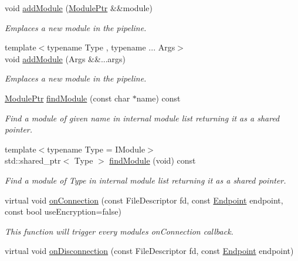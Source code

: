 \begin{DoxyCompactItemize}
void \mbox{\hyperlink{classo_z_1_1_pipeline_aa96f1ef3faeb41c9966d6b5a103fa3a5}{add\+Module}} (\mbox{\hyperlink{namespaceo_z_af5a56aaaee027504979038f38991adcf}{Module\+Ptr}} \&\&module)
\begin{DoxyCompactList}\small\item\em Emplaces a new module in the pipeline. \end{DoxyCompactList}\item 
{\footnotesize template$<$typename Type , typename ... Args$>$ }\\void \mbox{\hyperlink{classo_z_1_1_pipeline_a797f98947aace930fbb15cd6b2d9f726}{add\+Module}} (Args \&\&...args)
\begin{DoxyCompactList}\small\item\em Emplaces a new module in the pipeline. \end{DoxyCompactList}\item 
\mbox{\hyperlink{namespaceo_z_af5a56aaaee027504979038f38991adcf}{Module\+Ptr}} \mbox{\hyperlink{classo_z_1_1_pipeline_aa8aa56af891b2d889e7c21198daa1451}{find\+Module}} (const char $\ast$name) const
\begin{DoxyCompactList}\small\item\em Find a module of given name in internal module list returning it as a shared pointer. \end{DoxyCompactList}\item 
{\footnotesize template$<$typename Type  = I\+Module$>$ }\\std\+::shared\+\_\+ptr$<$ Type $>$ \mbox{\hyperlink{classo_z_1_1_pipeline_a4f1abc0f7c0985dbc859cd5b20082998}{find\+Module}} (void) const
\begin{DoxyCompactList}\small\item\em Find a module of Type in internal module list returning it as a shared pointer. \end{DoxyCompactList}\item 
virtual void \mbox{\hyperlink{classo_z_1_1_pipeline_a7cfbdda27bd9ef9919400ce598846731}{on\+Connection}} (const File\+Descriptor fd, const \mbox{\hyperlink{classo_z_1_1_endpoint}{Endpoint}} endpoint, const bool use\+Encryption=false)
\begin{DoxyCompactList}\small\item\em This function will trigger every module\textquotesingle{}s \textquotesingle{}on\+Connection\textquotesingle{} callback. \end{DoxyCompactList}\item 
virtual void \mbox{\hyperlink{classo_z_1_1_pipeline_afd035df19d82c10b55af51e727e08407}{on\+Disconnection}} (const File\+Descriptor fd, const \mbox{\hyperlink{classo_z_1_1_endpoint}{Endpoint}} endpoint)

\end{DoxyCompactItemize}

